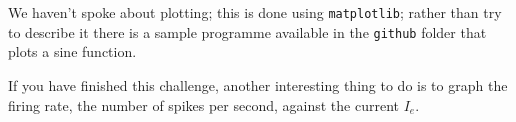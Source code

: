 \documentclass[12pt]{article}
\begin{document}
We haven't spoke about plotting; this is done using
\texttt{matplotlib}; rather than try to describe it there is a sample
programme available in the \texttt{github} folder that plots a sine
function.

If you have finished this challenge, another interesting thing to do
is to graph the firing rate, the number of spikes per second, against
the current $I_e$.
\end{document}
